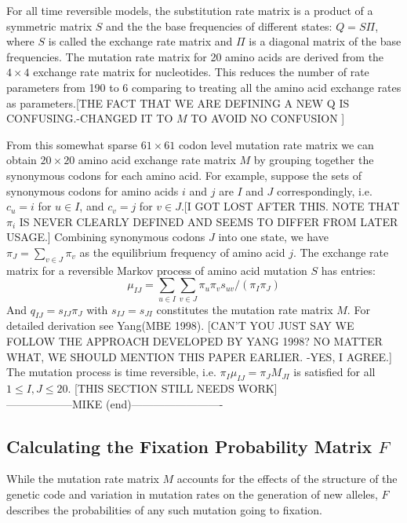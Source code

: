 For all time reversible models, the substitution rate matrix is a product of a symmetric matrix $S$ and the the base frequencies of different states: $Q = S\Pi$, where $S$ is called the exchange rate matrix and $\Pi$ is a diagonal matrix of the base frequencies.
The mutation rate matrix for 20 amino acids are derived from the $4 \times 4 $ exchange rate matrix for nucleotides.
This reduces the number of rate parameters from 190 to 6 comparing to treating all the amino acid exchange rates as parameters.[THE FACT THAT WE ARE DEFINING A NEW Q IS CONFUSING.-CHANGED IT TO $M$ TO AVOID NO CONFUSION ]

From this somewhat sparse $61 \times 61$ codon level mutation rate matrix we can obtain $20 \times 20$ amino acid exchange rate matrix $M$ by grouping together the synonymous codons for each amino acid.
For example, suppose the sets of synonymous codons for amino acids $i$ and $j$ are $I$ and $J$ correspondingly, i.e. $c_u = i$ for $u \in I$, and $c_v = j$ for $v \in J$.[I GOT LOST AFTER THIS. NOTE THAT $\pi_i$ IS NEVER CLEARLY DEFINED AND SEEMS TO DIFFER FROM LATER USAGE.]
Combining synonymous codons $J$ into one state, we have $\pi_J = \sum_{v \in J} \pi_v$ as the equilibrium frequency of amino acid $j$.
The exchange rate matrix for a reversible Markov process of amino acid mutation $S$ has entries:
\[\mu_{IJ} = \sum_{u \in I} \sum_{v \in J} \pi_u \pi_v s_{uv} / (\pi_I \pi_J)\]
\noindent
And $q_{IJ} = s_{IJ} \pi_J$ with $s_{IJ}  = s_{JI}$ constitutes the mutation rate matrix $M$.
For detailed derivation see Yang(MBE 1998). [CAN'T YOU JUST SAY WE FOLLOW THE APPROACH DEVELOPED BY YANG 1998?  NO MATTER WHAT, WE SHOULD MENTION THIS PAPER EARLIER. -YES, I AGREE.]
The mutation process is time reversible, i.e. $\pi_I \mu_{IJ} = \pi_J M_{JI}$ is satisfied for all $1 \leq I,J \leq 20$.
[THIS SECTION STILL NEEDS WORK]\\
------------------MIKE (end)-------------------------
\subsection*{Calculating the Fixation Probability Matrix $F$}
While the mutation rate matrix $M$ accounts for the effects of the structure of the genetic code and variation in mutation rates on the generation of new alleles,  $F$ describes the probabilities of any such mutation going to fixation.


